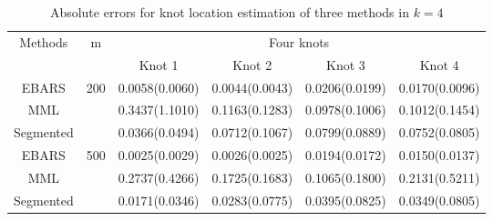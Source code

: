 \begin{table}
\caption{Absolute errors for knot location estimation of three methods in $k=4$}
\label{tab:knot_2}
\centering
\begin{tabular}{cccccc}
\toprule
\multirow{2}{*}{Methods} & \multirow{2}{*}{m}   & \multicolumn{4}{c}{Four knots}                                      \\
\cline{3-6}
                         &                      & Knot 1         & Knot 2         & Knot 3         & Knot 4         \\
                         \midrule
EBARS                    & \multirow{3}{*}{200} & 0.0058(0.0060) & 0.0044(0.0043) & 0.0206(0.0199) & 0.0170(0.0096) \\
MML                      &                      & 0.3437(1.1010) & 0.1163(0.1283) & 0.0978(0.1006) & 0.1012(0.1454) \\
Segmented                &                      & 0.0366(0.0494) & 0.0712(0.1067) & 0.0799(0.0889) & 0.0752(0.0805) \\
\midrule
EBARS                    & \multirow{3}{*}{500} & 0.0025(0.0029) & 0.0026(0.0025) & 0.0194(0.0172) & 0.0150(0.0137) \\
MML                      &                      & 0.2737(0.4266) & 0.1725(0.1683) & 0.1065(0.1800) & 0.2131(0.5211) \\
Segmented                &                      & 0.0171(0.0346) & 0.0283(0.0775) & 0.0395(0.0825) & 0.0349(0.0805) \\
\bottomrule
\end{tabular}
\end{table}